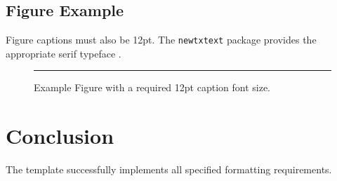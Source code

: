 \documentclass[12pt, letterpaper]{article} %
\begin{document}
\subsection{Figure Example}
Figure captions must also be 12pt. The \texttt{newtxtext} package provides the appropriate serif typeface \citep[see also][]{jones2022another}.

\begin{figure}[h]
    \centering
    \rule{0.6\textwidth}{4cm} 
    \caption{Example Figure with a required 12pt caption font size.}
    \label{fig:figure_example}
\end{figure}

\section{Conclusion}
The template successfully implements all specified formatting requirements.

\newpage %

 
 
\end{document}
